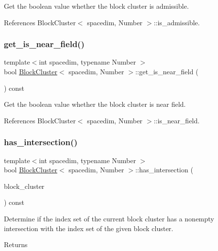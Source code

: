 Get the boolean value whether the block cluster is admissible. 

References Block\+Cluster$<$ spacedim, Number $>$\+::is\+\_\+admissible.

\mbox{\label{classBlockCluster_ac263721e28921a6177a025139745fe8d}} 
\subsubsection{\texorpdfstring{get\+\_\+is\+\_\+near\+\_\+field()}{get\_is\_near\_field()}}
{\footnotesize\ttfamily template$<$int spacedim, typename Number $>$ \\
bool \hyperlink{classBlockCluster}{Block\+Cluster}$<$ spacedim, Number $>$\+::get\+\_\+is\+\_\+near\+\_\+field (\begin{DoxyParamCaption}{ }\end{DoxyParamCaption}) const}

Get the boolean value whether the block cluster is near field. 

References Block\+Cluster$<$ spacedim, Number $>$\+::is\+\_\+near\+\_\+field.

\mbox{\label{classBlockCluster_adf556b6483f3a81a39d3625c15e9787d}} 
\subsubsection{\texorpdfstring{has\+\_\+intersection()}{has\_intersection()}}
{\footnotesize\ttfamily template$<$int spacedim, typename Number $>$ \\
bool \hyperlink{classBlockCluster}{Block\+Cluster}$<$ spacedim, Number $>$\+::has\+\_\+intersection (\begin{DoxyParamCaption}\item[{const \hyperlink{classBlockCluster}{Block\+Cluster}$<$ spacedim, Number $>$ \&}]{block\+\_\+cluster }\end{DoxyParamCaption}) const}

Determine if the index set of the current block cluster has a nonempty intersection with the index set of the given block cluster. \begin{DoxyReturn}{Returns}

\end{DoxyReturn}


